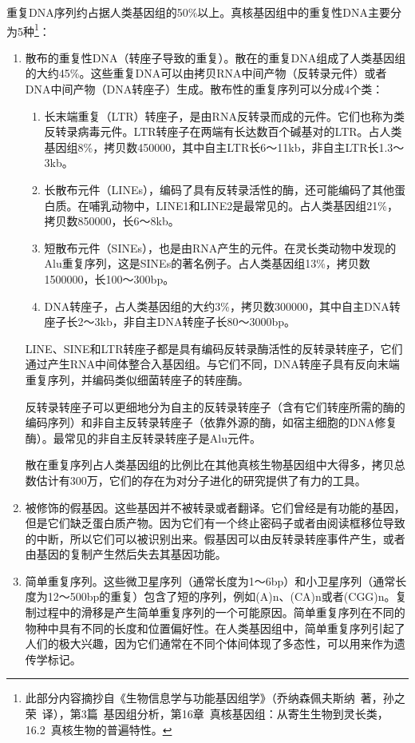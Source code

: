 \documentclass[11pt,a4paper,twoside]{book}
\begin{document}
重复DNA序列约占据人类基因组的50\%以上。真核基因组中的重复性DNA主要分为5种\footnote{此部分内容摘抄自《生物信息学与功能基因组学》（乔纳森\textbullet 佩夫斯纳\ 著，孙之荣\ 译），第3篇\ 基因组分析，第16章\ 真核基因组：从寄生生物到灵长类，16.2\ 真核生物的普遍特性。}：
\begin{enumerate}
  \item 散布的重复性DNA（转座子导致的重复）。散在的重复DNA组成了人类基因组的大约45\%。这些重复DNA可以由拷贝RNA中间产物（反转录元件）或者DNA中间产物（DNA转座子）生成。散布性的重复序列可以分成4个类：
    \begin{enumerate}
      \item 长末端重复（LTR）转座子，是由RNA反转录而成的元件。它们也称为类反转录病毒元件。LTR转座子在两端有长达数百个碱基对的LTR。占人类基因组8\%，拷贝数450000，其中自主LTR长6～11kb，非自主LTR长1.3～3kb。
      \item 长散布元件（LINEs），编码了具有反转录活性的酶，还可能编码了其他蛋白质。在哺乳动物中，LINE1和LINE2是最常见的。占人类基因组21\%，拷贝数850000，长6～8kb。
      \item 短散布元件（SINEs），也是由RNA产生的元件。在灵长类动物中发现的Alu重复序列，这是SINEs的著名例子。占人类基因组13\%，拷贝数1500000，长100～300bp。
      \item DNA转座子，占人类基因组的大约3\%，拷贝数300000，其中自主DNA转座子长2～3kb，非自主DNA转座子长80～3000bp。
    \end{enumerate}
    LINE、SINE和LTR转座子都是具有编码反转录酶活性的反转录转座子，它们通过产生RNA中间体整合入基因组。与它们不同，DNA转座子具有反向末端重复序列，并编码类似细菌转座子的转座酶。

    反转录转座子可以更细地分为自主的反转录转座子（含有它们转座所需的酶的编码序列）和非自主反转录转座子（依靠外源的酶，如宿主细胞的DNA修复酶）。最常见的非自主反转录转座子是Alu元件。

    散在重复序列占人类基因组的比例比在其他真核生物基因组中大得多，拷贝总数估计有300万，它们的存在为对分子进化的研究提供了有力的工具。
  \item 被修饰的假基因。这些基因并不被转录或者翻译。它们曾经是有功能的基因，但是它们缺乏蛋白质产物。因为它们有一个终止密码子或者由阅读框移位导致的中断，所以它们可以被识别出来。假基因可以由反转录转座事件产生，或者由基因的复制产生然后失去其基因功能。
  \item 简单重复序列。这些微卫星序列（通常长度为1～6bp）和小卫星序列（通常长度为12～500bp的重复）包含了短的序列，例如(A)n、(CA)n或者(CGG)n。复制过程中的滑移是产生简单重复序列的一个可能原因。简单重复序列在不同的物种中具有不同的长度和位置偏好性。在人类基因组中，简单重复序列引起了人们的极大兴趣，因为它们通常在不同个体间体现了多态性，可以用来作为遗传学标记。


\end{enumerate}
\end{document}
